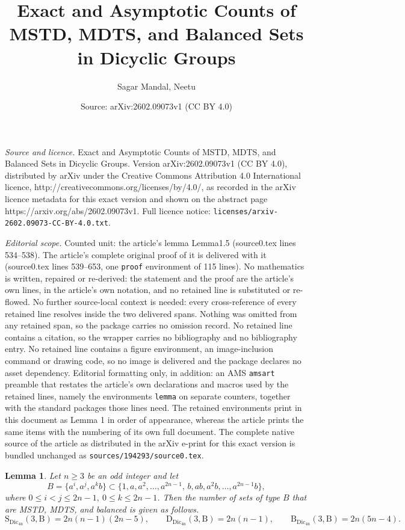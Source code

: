 \documentclass[10pt,a4paper]{amsart}
\title{Exact and Asymptotic Counts of MSTD, MDTS, and Balanced Sets in Dicyclic Groups}
\author{Sagar Mandal, Neetu}
\date{Source: arXiv:2602.09073v1 (CC BY 4.0)}
\newtheorem{lemma}{Lemma}
\begin{document}
\maketitle

\noindent\emph{Source and licence.} Exact and Asymptotic Counts of MSTD, MDTS, and Balanced Sets in Dicyclic Groups. Version arXiv:2602.09073v1 (CC BY 4.0), distributed by arXiv under the Creative Commons Attribution 4.0 International licence, http://creativecommons.org/licenses/by/4.0/, as recorded in the arXiv licence metadata for this exact version and shown on the abstract page https://arxiv.org/abs/2602.09073v1. Full licence notice: \texttt{licenses/arxiv-2602.09073-CC-BY-4.0.txt}.\par\smallskip

\noindent\textit{Editorial scope.} Counted unit: the article's lemma Lemma1.5 (source0.tex lines 534--538). The article's complete original proof of it is delivered with it (source0.tex lines 539--653, one \texttt{proof} environment of 115 lines). No mathematics is written, repaired or re-derived: the statement and the proof are the article's own lines, in the article's own notation, and no retained line is substituted or re-flowed.  No further source-local context is needed: every cross-reference of every retained line resolves inside the two delivered spans.  Nothing was omitted from any retained span, so the package carries no omission record.  No retained line contains a citation, so the wrapper carries no bibliography and no bibliography entry.  No retained line contains a figure environment, an image-inclusion command or drawing code, so no image is delivered and the package declares no asset dependency.  Editorial formatting only, in addition: an AMS \texttt{amsart} preamble that restates the article's own declarations and macros used by the retained lines, namely the environments \texttt{lemma} on separate counters, together with the standard packages those lines need.  The retained environments print in this document as Lemma 1 in order of appearance, whereas the article prints the same items with the numbering of its own full document.  The complete native source of the article as distributed in the arXiv e-print for this exact version is bundled unchanged as \texttt{sources/194293/source0.tex}.
\begin{lemma}\label{Lemma1.5}
Let $n\geq3$ be an odd integer and let 
$$B=\{a^i,a^j,a^kb\}\subset \{1,a,a^{2},\ldots,a^{2n-1},\, b,ab,a^{2}b,\ldots,a^{2n-1}b\},$$ where $0\leq i<j\leq 2n-1,~0\leq k\leq 2n-1$. Then the number of sets of type $B$ that are MSTD, MDTS, and balanced is given as follows.
$$\mathrm{S_{\mathrm{Dic_{4n}}}(3,B)}=2n(n-1)(2n-5),\qquad\mathrm{D_{\mathrm{Dic_{4n}}}(3,B)}=2n(n-1),\qquad\mathrm{B_{\mathrm{Dic_{4n}}}(3,B)}=2n(5n-4).$$
\end{lemma}
\end{document}
